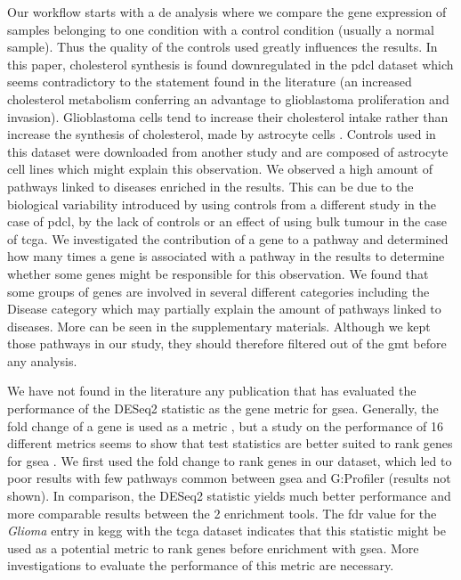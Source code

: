 Our workflow starts with a \acrlong{de} analysis where we compare the gene expression of samples belonging to one condition with a control condition (usually a normal sample).
Thus the quality of the controls used greatly influences the results.
In this paper, cholesterol synthesis is found downregulated in the \acrshort{pdcl} dataset which seems contradictory to the statement found in the literature (an increased cholesterol metabolism conferring an advantage to glioblastoma proliferation and invasion).
Glioblastoma cells tend to increase their cholesterol intake rather than increase the synthesis of cholesterol, made by astrocyte cells \cite*{Villa2016, Pirmoradi2019}.
Controls used in this dataset were downloaded from another study and are composed of astrocyte cell lines which might explain this observation.
We observed a high amount of pathways linked to diseases enriched in the results.
This can be due to the biological variability introduced by using controls from a different study in the case of \acrshort{pdcl}, by the lack of controls or an effect of using bulk tumour in the case of \acrshort{tcga}.
We investigated the contribution of a gene to a pathway and determined how many times a gene is associated with a pathway in the results to determine whether some genes might be responsible for this observation.
We found that some groups of genes are involved in several different categories including the Disease category which may partially explain the amount of pathways linked to diseases.
More can be seen in the supplementary materials.
Although we kept those pathways in our study, they should therefore filtered out of the \acrshort{gmt} before any analysis.

We have not found in the literature any publication that has evaluated the performance of the DESeq2 statistic as the gene metric for \acrshort{gsea}.
Generally, the fold change of a gene is used as a metric \cite*{Reimand2019}, but a study on the performance of 16 different metrics seems to show that test statistics are better suited to rank genes for \acrshort{gsea} \cite*{Zyla2017}.
We first used the fold change to rank genes in our dataset, which led to poor results with few pathways common between \acrshort{gsea} and G:Profiler (results not shown).
In comparison, the DESeq2 statistic yields much better performance and more comparable results between the 2 enrichment tools.
The \acrshort{fdr} value for the \textit{Glioma} entry in \acrshort{kegg} with the \acrshort{tcga} dataset indicates that this statistic might be used as a potential metric to rank genes before enrichment with \acrshort{gsea}.
More investigations to evaluate the performance of this metric are necessary.

